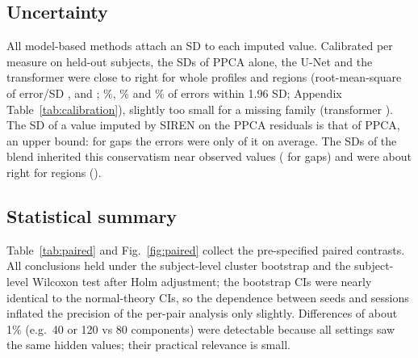 \documentclass[11pt]{article}
\begin{document}
\begin{table}[t]
\centering\footnotesize
\caption{Absolute RMSE (four patterns, mean over patterns and seeds) per age bin; FA, NDI, ODI, FWF $\times10^{3}$, MD,
RD, AD $\times10^{6}$\,mm$^2$/s. Released default and HBCD-reference blend cross-fitted.}\label{tab:absolute}
\setlength{\tabcolsep}{4pt}

\end{table}

\subsection{Uncertainty}

All model-based methods attach an SD to each imputed value. Calibrated per measure on held-out subjects, the SDs of
PPCA alone, the U-Net and the transformer were close to right for whole profiles and regions (root-mean-square of
error/SD \kPpcaWholeRms, \kUnetWholeRms{} and \kTfWholeRms; \kPpcaWholeIn\%, \kUnetWholeIn\% and \kTfWholeIn\% of
errors within 1.96 SD; Appendix Table~\ref{tab:calibration}), slightly too small for a missing family
(transformer \kTfFamilyRms). The SD of a value imputed by SIREN on the PPCA residuals is that of PPCA, an upper bound:
for gaps the errors were only \kDefGapRms{} of it on average. The SDs of the blend inherited this conservatism near
observed values (\kBlendGapRms{} for gaps) and were about right for regions (\kBlendRegionRms).

\subsection{Statistical summary}

Table~\ref{tab:paired} and Fig.~\ref{fig:paired} collect the pre-specified paired contrasts. All conclusions held
under the subject-level cluster bootstrap and the subject-level Wilcoxon test after Holm adjustment; the bootstrap CIs
were nearly identical to the normal-theory CIs, so the dependence between seeds and sessions inflated the precision of
the per-pair analysis only slightly. Differences of about 1\% (e.g.\ 40 or 120 vs 80 components) were detectable
because all settings saw the same hidden values; their practical relevance is small.

\begin{table}[t]
\centering\footnotesize
\caption{Paired per-scan comparisons over \nPairs{} scan $\times$ seed pairs (\nSubjPairs{} subjects): geometric mean of
the ratio of per-scan errors (compared / reference; below 1: compared is better), 95\% CI from the pairs and from a
subject-level cluster bootstrap, Holm-adjusted Wilcoxon $p$ over the \nContrasts{} contrasts (on the pairs / on subject
means), and the share of pairs where the compared setting is better.}\label{tab:paired}
\setlength{\tabcolsep}{3pt}
\resizebox{\textwidth}{!}{}
\end{table}
\end{document}
